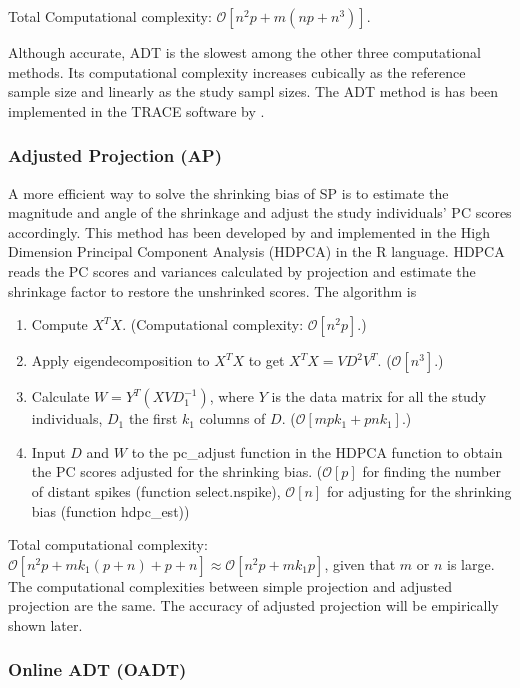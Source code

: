 \documentclass{article}
\newcommand{\bO}{\mathcal{O}}
\begin{document}
Total Computational complexity: $\bO[n^2p + m(np + n^3)]$.

Although accurate, ADT is the slowest among the other three computational methods.
Its computational complexity increases cubically as the reference sample size and linearly as the study sampl sizes.
The ADT method is has been implemented in the TRACE software by \cite{wang}.


\subsubsection{Adjusted Projection (AP)}

A more efficient way to solve the shrinking bias of SP is to estimate the
magnitude and angle of the shrinkage and adjust the study individuals' PC scores accordingly.
This method has been developed by \cite{dey} and implemented in the High
Dimension Principal Component Analysis (HDPCA) in the R language.
HDPCA reads the PC scores and variances calculated by projection and estimate the shrinkage factor to restore the unshrinked scores. 
The algorithm is
\begin{enumerate}
\item Compute $X^T X$.
  (Computational complexity: $\bO[n^2p]$.)  
\item Apply eigendecomposition to $X^T X$ to get $X^T X = V D^2 V^T$.
  ($\bO[n^3]$.)
\item Calculate $W = Y^T (X V D_1^{-1})$, where $Y$ is the data matrix for all the study individuals, $D_1$ the first $k_1$ columns of $D$. ($\bO[mpk_1 + pnk_1]$.)
  \item Input $D$ and $W$ to the pc\_adjust function in the HDPCA function to obtain the PC scores adjusted for the shrinking bias. ($\bO[p]$ for finding the number of distant spikes (function select.nspike), $\bO[n]$ for adjusting for the shrinking bias (function hdpc\_est))
\end{enumerate}

Total computational complexity: $\bO[n^2p + mk_1(p + n) + p + n] \approx \bO[n^2p + mk_1p]$,
given that $m$ or $n$ is large. The computational complexities between simple projection and adjusted projection are the same.
The accuracy of adjusted projection will be empirically shown later.

\subsubsection{Online ADT (OADT)}
\end{document}
